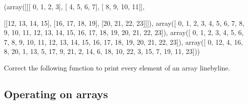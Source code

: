 \documentclass[letterpaper,10pt,english]{sphinxmanual}
\begin{document}
\begin{sphinxVerbatim}[commandchars=\\\{\}]
(array([[[ 0,  1,  2,  3],
         [ 4,  5,  6,  7],
         [ 8,  9, 10, 11]],
 
        [[12, 13, 14, 15],
         [16, 17, 18, 19],
         [20, 21, 22, 23]]]),
 array([ 0,  1,  2,  3,  4,  5,  6,  7,  8,  9, 10, 11, 12, 13, 14, 15, 16,
        17, 18, 19, 20, 21, 22, 23]),
 array([ 0,  1,  2,  3,  4,  5,  6,  7,  8,  9, 10, 11, 12, 13, 14, 15, 16,
        17, 18, 19, 20, 21, 22, 23]),
 array([ 0, 12,  4, 16,  8, 20,  1, 13,  5, 17,  9, 21,  2, 14,  6, 18, 10,
        22,  3, 15,  7, 19, 11, 23]))
\end{sphinxVerbatim}

 Correct the following function to print every element of an array line\sphinxhyphen{}by\sphinxhyphen{}line.

\begin{sphinxVerbatim}[commandchars=\\\{\}]
 
       
\end{sphinxVerbatim}

\begin{sphinxVerbatim}[commandchars=\\\{\}]
 
       
    
\end{sphinxVerbatim}


\subsection{Operating on  arrays}
\label{\detokenize{Lecture9/Monte Carlo Simulation and Linear Algebra:operating-on-numpy-arrays}}
\end{document}
